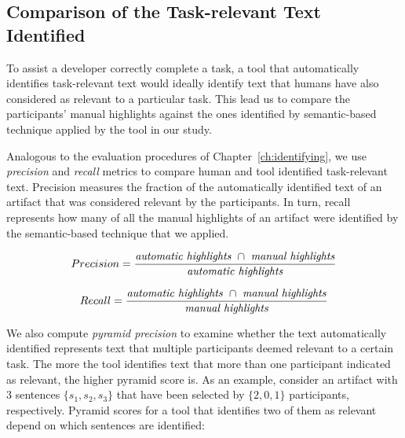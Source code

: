 
\subsection{Comparison of the Task-relevant Text Identified}
\label{cp6:comparison}


To assist a developer correctly complete a task, a tool that
automatically identifies task-relevant text would ideally 
identify text that humans have also considered as relevant to a particular task. 
This lead us to compare the participants' manual highlights against the ones 
identified by semantic-based technique applied by the tool in our study.
 



Analogous to the evaluation procedures of Chapter~\ref{ch:identifying}, we use 
\textit{precision} and \textit{recall} metrics
to compare human and tool identified task-relevant text.
Precision measures the fraction of the automatically identified text of an artifact that was  considered relevant
by the participants. 
In turn, recall represents how many of all the manual highlights of an artifact were identified by the semantic-based technique that we applied.

\smallskip
\begin{small}


\begin{equation}
    Precision = \frac{
        \text{\textit{automatic highlights}~} \cap 
        \text{~\textit{manual highlights}}
    }{\text{\textit{automatic highlights}}}
\end{equation}
\end{small}


\begin{small}
\begin{equation}
    Recall = \frac{
        \text{\textit{automatic highlights}~} \cap 
        \text{~\textit{manual highlights}}
    }{\text{\textit{manual highlights}}}
\end{equation}
\end{small}

\medskip


We also compute \textit{pyramid precision} to examine whether the text automatically identified represents text that multiple participants deemed relevant to a certain task.
The more the tool identifies text that more than one participant indicated as relevant, the higher pyramid score is.
As an example, consider an artifact with 3 sentences $\{s_1, s_2, s_3\}$ that have been selected by $\{2, 0, 1\}$ participants, respectively.
Pyramid scores for a tool that identifies two of them as relevant depend on which sentences are identified:




